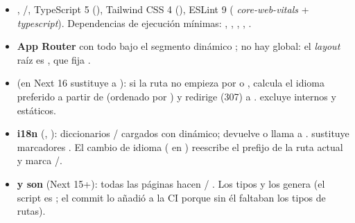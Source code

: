 \begin{itemize}
\item {}, /, TypeScript 5 (), Tailwind CSS 4 (), ESLint 9 ( \emph{core-web-vitals} + \emph{typescript}). Dependencias de ejecución mínimas: , , , , .
\item \textbf{App Router} con todo bajo el segmento dinámico ; no hay  global: el \emph{layout} raíz es , que fija .
\item \textbf{} (en Next 16 sustituye a ): si la ruta no empieza por  o , calcula el idioma preferido a partir de  (ordenado por ) y redirige (307) a .  excluye internos y estáticos.
\item \textbf{i18n} (, ): diccionarios / cargados con  dinámico;  devuelve  o llama a .  sustituye marcadores . El cambio de idioma ( en ) reescribe el prefijo de la ruta actual y marca /.
\item \textbf{ y  son } (Next 15+): todas las páginas hacen  / . Los tipos  y  los genera \textbf{} (el script  es ; el commit  lo añadió a la CI porque sin él faltaban los tipos de rutas).

\end{itemize}
